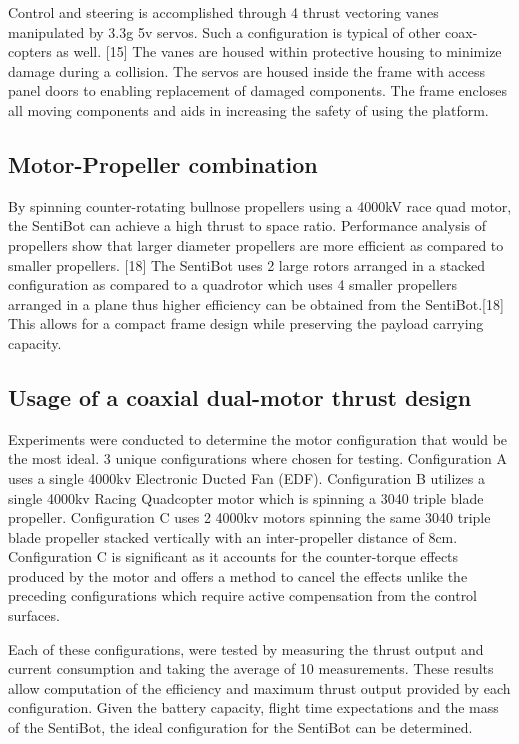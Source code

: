 \documentclass[12pt]{article}
\begin{document}
Control and steering is accomplished through 4 thrust vectoring vanes manipulated by 3.3g 5v servos. Such a configuration is typical of other coax-copters as well. [15] The vanes are housed within protective housing to minimize damage during a collision. The servos are housed inside the frame with access panel doors to enabling replacement of damaged components. The frame encloses all moving components and aids in increasing the safety of using the platform.

\subsection{Motor-Propeller combination}

By spinning counter-rotating bullnose propellers using a 4000kV race quad motor, the SentiBot can achieve a high thrust to space ratio. Performance analysis of propellers show that larger diameter propellers are more efficient as compared to smaller propellers. [18] The SentiBot uses 2 large rotors arranged in a stacked configuration as compared to a quadrotor which uses 4 smaller propellers arranged in a plane thus higher efficiency can be obtained from the SentiBot.[18] This allows for a compact frame design while preserving the payload carrying capacity.

\subsection{Usage of a coaxial dual-motor thrust design}

Experiments were conducted to determine the motor configuration that would be the most ideal. 3 unique configurations where chosen for testing. Configuration A uses a single 4000kv Electronic Ducted Fan (EDF).  Configuration B utilizes a single 4000kv Racing Quadcopter motor which is spinning a 3040 triple blade propeller. Configuration C uses 2 4000kv motors spinning the same 3040 triple blade propeller stacked vertically with an inter-propeller distance of 8cm. Configuration C is significant as it accounts for the counter-torque effects produced by the motor and offers a method to cancel the effects unlike the preceding configurations which require active compensation from the control surfaces.

Each of these configurations, were tested by measuring the thrust output and current consumption and taking the average of 10 measurements. These results allow computation of the efficiency and maximum thrust output provided by each configuration. Given the battery capacity, flight time expectations and the mass of the SentiBot, the ideal configuration for the SentiBot can be determined.
\end{document}
